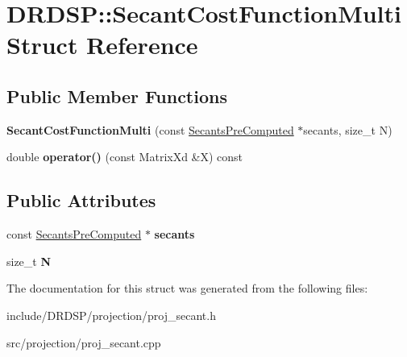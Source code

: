 \hypertarget{struct_d_r_d_s_p_1_1_secant_cost_function_multi}{\section{D\-R\-D\-S\-P\-:\-:Secant\-Cost\-Function\-Multi Struct Reference}
\label{struct_d_r_d_s_p_1_1_secant_cost_function_multi}
}
\subsection*{Public Member Functions}
\begin{DoxyCompactItemize}
\item 
\hypertarget{struct_d_r_d_s_p_1_1_secant_cost_function_multi_afb35a27d0cfb21e1d64c0fb152781351}{{\bfseries Secant\-Cost\-Function\-Multi} (const \hyperlink{struct_d_r_d_s_p_1_1_secants_pre_computed}{Secants\-Pre\-Computed} $\ast$secants, size\-\_\-t N)}\label{struct_d_r_d_s_p_1_1_secant_cost_function_multi_afb35a27d0cfb21e1d64c0fb152781351}

\item 
\hypertarget{struct_d_r_d_s_p_1_1_secant_cost_function_multi_a40271ed4db634786ff8732acb99e7ddb}{double {\bfseries operator()} (const Matrix\-Xd \&X) const }\label{struct_d_r_d_s_p_1_1_secant_cost_function_multi_a40271ed4db634786ff8732acb99e7ddb}

\end{DoxyCompactItemize}
\subsection*{Public Attributes}
\begin{DoxyCompactItemize}
\item 
\hypertarget{struct_d_r_d_s_p_1_1_secant_cost_function_multi_a9835a40b01057d7cbab68852beb7f14e}{const \hyperlink{struct_d_r_d_s_p_1_1_secants_pre_computed}{Secants\-Pre\-Computed} $\ast$ {\bfseries secants}}\label{struct_d_r_d_s_p_1_1_secant_cost_function_multi_a9835a40b01057d7cbab68852beb7f14e}

\item 
\hypertarget{struct_d_r_d_s_p_1_1_secant_cost_function_multi_a7c2b1b7e3474de697285d9265ed60c39}{size\-\_\-t {\bfseries N}}\label{struct_d_r_d_s_p_1_1_secant_cost_function_multi_a7c2b1b7e3474de697285d9265ed60c39}

\end{DoxyCompactItemize}


The documentation for this struct was generated from the following files\-:\begin{DoxyCompactItemize}
\item 
include/\-D\-R\-D\-S\-P/projection/proj\-\_\-secant.\-h\item 
src/projection/proj\-\_\-secant.\-cpp\end{DoxyCompactItemize}
